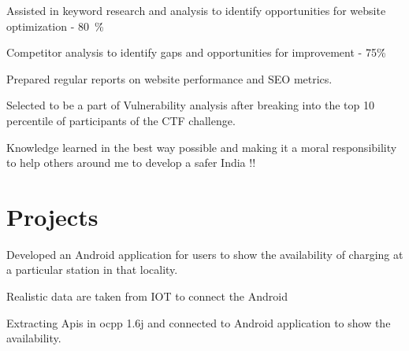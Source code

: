 \documentclass[]{deedy-resume-openfont}
\begin{document}
\begin{minipage}[t]{0.66\textwidth}
\begin{tightemize}
\item Assisted in keyword research and analysis to identify opportunities for website optimization - 80\ \%\.
\item Competitor analysis to identify gaps and opportunities for improvement - 75\%\.
\item  Prepared regular reports on website performance and SEO metrics.
\end{tightemize}
\sectionsep

\begin{tightemize}
\item Selected to be a part of Vulnerability analysis after breaking into the top 10 percentile of participants of the CTF challenge.
\item 
 Knowledge learned in the best way possible and making it a moral responsibility to help others around me to develop a safer India !!
\end{tightemize}
\sectionsep




\section{Projects}
\begin{tightemize}
\item Developed an Android application for users to show the availability of charging at a particular station in that locality.
\item Realistic data are taken from IOT to connect the Android 
\item Extracting Apis in ocpp 1.6j and connected to Android application to show the availability.
\end{tightemize}
\sectionsep


\end{minipage}
\end{document}
